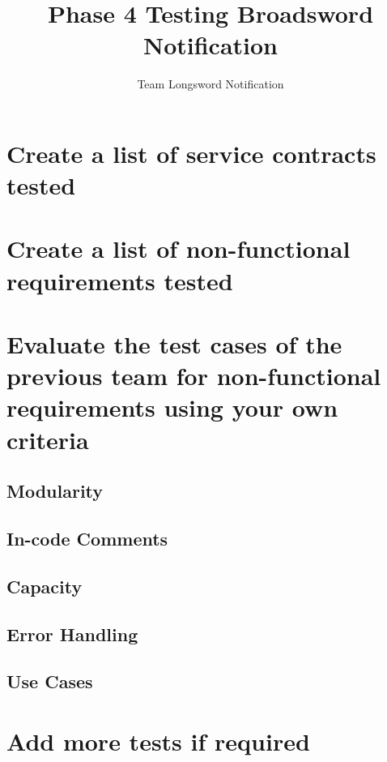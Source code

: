 \documentclass[11pt]{article}
\author{Team Longsword Notification}
\title{Phase 4 Testing Broadsword Notification}
\begin{document}
	\setlength{\parskip}{6pt}
	
	
	
	\tableofcontents
	
	\newpage
	
	
	\section{Create a list of service contracts tested}
	\section{Create a list of non-functional requirements tested}
	\section{Evaluate the test cases of the previous team for non-functional requirements using your own criteria}	
		\subsection{Modularity}
			\paragraph{}
		\subsection{In-code Comments}
			\paragraph{}
		\subsection{Capacity}
			\paragraph{}
		\subsection{Error Handling}
			\paragraph{}
		\subsection{Use Cases}
			\paragraph{}
	\section{Add more tests if required}


	
	
\end{document}
